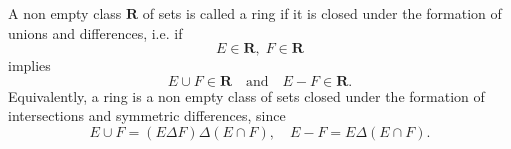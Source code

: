 A non empty class $\mathbf{R}$ of sets is called a ring if it is closed under the formation of unions and differences, i.e. if
$$E \in \mathbf{R}, \; F \in \mathbf{R}$$
implies
$$E \cup F \in \mathbf{R} \quad \text{and} \quad E - F \in \mathbf{R}.$$
Equivalently, a ring is a non empty class of sets closed under the formation of intersections and symmetric differences, since
$$E \cup F = (E \Delta F) \Delta (E \cap F), \quad E - F = E \Delta (E \cap F).$$
